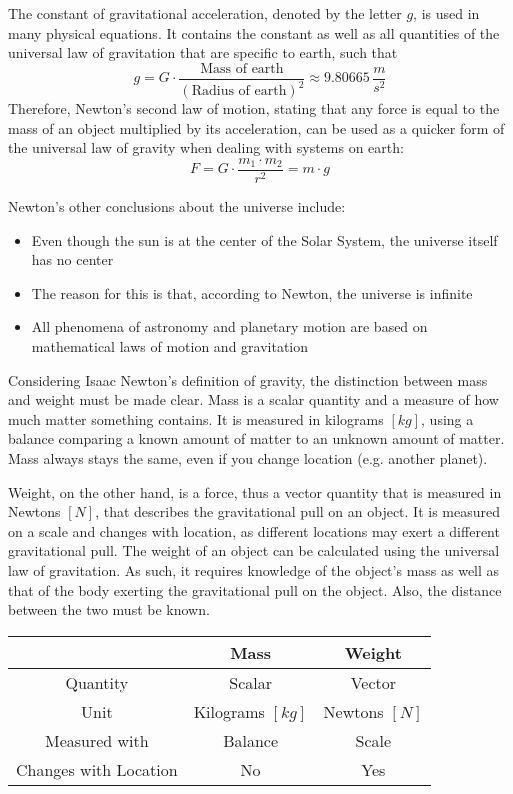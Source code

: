 \vspace{\parskip}

The constant of gravitational acceleration, denoted by the letter $g$, is used in many physical equations. It contains the constant as well as all quantities of the universal law of gravitation that are specific to earth, such that $$g = G \cdot \frac{\text{Mass of earth}}{(\text{Radius of earth})^2} \approx 9.80665 \, \frac{m}{s^2}$$ Therefore, Newton's second law of motion, stating that any force is equal to the mass of an object multiplied by its acceleration, can be used as a quicker form of the universal law of gravity when dealing with systems on earth: $$F = G \cdot \frac{m_1 \cdot m_2}{r^2} = m \cdot g$$

Newton's other conclusions about the universe include:

\begin{itemize}
	\item Even though the sun is at the center of the Solar System, the universe itself has no center
	\item The reason for this is that, according to Newton, the universe is infinite
	\item All phenomena of astronomy and planetary motion are based on mathematical laws of motion and gravitation
\end{itemize}

\pagebreak


Considering Isaac Newton's definition of gravity, the distinction between mass and weight must be made clear. Mass is a scalar quantity and a measure of how much matter something contains. It is measured in kilograms $[kg]$, using a balance comparing a known amount of matter to an unknown amount of matter. Mass always stays the same, even if you change location (e.g. another planet). 

Weight, on the other hand, is a force, thus a vector quantity that is measured in Newtons $[N]$, that describes the gravitational pull on an object. It is measured on a scale and changes with location, as different locations may exert a different gravitational pull. The weight of an object can be calculated using the universal law of gravitation. As such, it requires knowledge of the object's mass as well as that of the body exerting the gravitational pull on the object. Also, the distance between the two must be known. 

\begin{table}[h!]
	\centering
	\begin{tabular}{| c | c | c |}
		\hline
		& Mass & Weight
		\\ \hline
		Quantity & Scalar & Vector
		\\ \hline
		Unit & Kilograms $[kg]$ & Newtons $[N]$
		\\ \hline
		Measured with & Balance & Scale
		\\ \hline
		Changes with Location & No & Yes
		\\ \hline
	\end{tabular}
\end{table}

